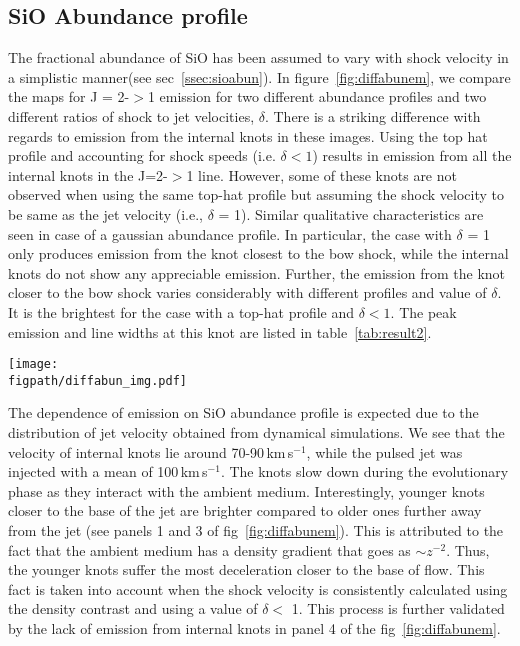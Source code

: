 \documentclass[useAMS,usenatbib]{mn2e}
\newcommand{\figpath}{/Users/bhargavvaidya/MyProject/work/Leeds_Uni/SiOJets_New/PAPER/PFIGS/}
\begin{document}
\subsection{SiO Abundance profile}
\label{ssec:sioabunem}
The fractional abundance of SiO has been assumed to vary with shock velocity in
a simplistic manner(see sec~\ref{ssec:sioabun}). In
figure~\ref{fig:diffabunem}, we compare the maps for J = 2-$>$1
emission for two different abundance profiles and two different ratios of shock to
jet velocities, $\delta$. There is a striking difference with regards to
emission from the internal knots in these images. Using the top hat profile
and accounting for shock speeds (i.e. $\delta < 1$) results in
emission from  all the internal knots in the J=2-$>$1 line. However, some of
these knots are not observed when using the same top-hat profile but
assuming the shock velocity to be same as the jet velocity (i.e.,
$\delta$ = 1). Similar qualitative characteristics are seen in case of a gaussian
abundance profile. In particular, the case with $\delta$ = 1 only
produces emission from the knot closest to the bow shock, while the internal
knots do not show any appreciable emission. Further, the emission from
the knot closer to the bow shock varies considerably with different
profiles and value of $\delta$. It is the brightest for the case with
a top-hat profile and $\delta < 1$. The peak emission and line widths at this knot
are listed in table~\ref{tab:result2}.
%

\begin{figure*}
 \texttt{[image: \\figpath/diffabun\_img.pdf]}%
 \caption{Variation of 2-$>$1 SiO emission for runs with molecular
   cooling having $\eta$ = 3 and $\beta$ = 10 and different abundance profiles.}
\label{fig:diffabunem}
\end{figure*}


The dependence of emission on SiO abundance profile is expected due to
the distribution of jet velocity obtained from dynamical
simulations. We see that the velocity of internal knots lie around
70-90\,km\,s$^{-1}$, while the pulsed jet was injected with a mean of
100\,km\,s$^{-1}$. The knots slow down during the evolutionary
phase as they interact with the ambient medium. Interestingly, younger
knots closer to the base of the jet are brighter compared to older
ones further away from the jet (see panels 1 and 3 of
fig~\ref{fig:diffabunem}). This is attributed to the fact that the
ambient medium has a density gradient that goes as $\sim
z^{-2}$. Thus, the younger knots suffer the most deceleration closer
to the base of flow. This fact is taken into account when the shock
velocity is consistently calculated using the density contrast and
using a value of $\delta <$ 1. This process is further validated by
the lack of emission from internal knots in panel 4 of the
fig~\ref{fig:diffabunem}. 
%
\end{document}
